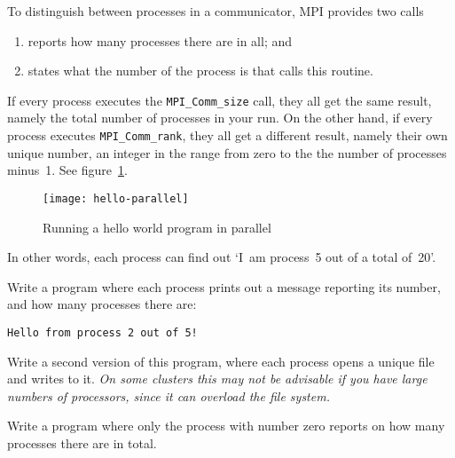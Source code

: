 To distinguish between processes in a communicator, MPI provides two calls
\begin{enumerate}
\item {} reports how many processes there are in all; and
\item {} states what the number of the
  process is that calls this routine.
\end{enumerate}

If every process executes the \lstinline$MPI_Comm_size$ call, they all get the
same result, namely the total number of processes in your run.
%
%
On the
other hand, if every process executes \lstinline$MPI_Comm_rank$, they all get
a different result, namely their own unique number, an integer in the
range from zero to the the number of processes minus~1.
See figure~\ref{fig:rank-parallel}.
%
%
\begin{figure}[ht]
  \texttt{[image: hello-parallel]}
  \caption{Running a hello world program in parallel}
  \label{fig:rank-parallel}
\end{figure}
%
In other words, each process can find out `I~am process~5
out of a total of~20'.

\begin{exercise}
  \label{ex:hello3}
  Write a program where each process prints out a message
  reporting its number, and how many processes there are:
\begin{verbatim}
Hello from process 2 out of 5!
\end{verbatim}

  Write a second version of this program, where each process opens a
  unique file and writes to it. \emph{On some clusters this may not be
    advisable if you have large numbers of processors, since it can
    overload the file system.}
\end{exercise}

\begin{exercise}
  \label{ex:hello4}
  Write a program where only the process with number zero
  reports on how many processes there are in total.
\end{exercise}
